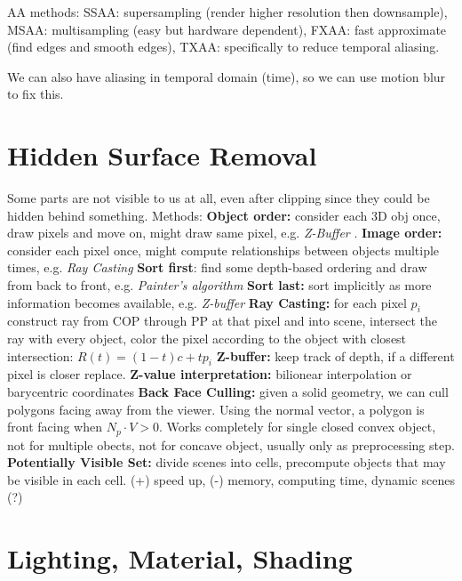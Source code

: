\documentclass[a4paper]{article}
\begin{document}
AA methods:
SSAA: supersampling (render higher resolution then downsample), MSAA: multisampling (easy but hardware dependent), FXAA: fast approximate (find edges and smooth edges), TXAA: specifically to reduce temporal aliasing.

We can also have aliasing in temporal domain (time), so we can use motion blur to fix this.



\section{ Hidden Surface Removal}

Some parts are not visible to us at all, even after clipping since they could be hidden behind something. Methods:
\textbf{Object order:}  consider each 3D obj once, draw pixels and move on, might draw same pixel, e.g. \textit{Z-Buffer} .
\newline
\textbf{Image order:} consider each pixel once, might compute relationships between objects multiple times, e.g. \textit{Ray Casting} 
\newline
\textbf{Sort first}: find some depth-based ordering and draw from back to front, e.g. \textit{Painter's algorithm}
\newline
\textbf{Sort last:} sort implicitly as more information becomes available, e.g. \textit{Z-buffer}    
\textbf{Ray Casting:} for each pixel $p_i$ construct ray from COP through PP at that pixel and into scene, intersect the ray with every object, color the pixel according to the object with closest intersection: $R(t)=(1-t)c + tp_i$ 
\newline
\textbf{Z-buffer:} keep track of depth, if a different pixel is closer replace.  
\textbf{Z-value interpretation: } bilionear interpolation or barycentric coordinates 
\newline
\textbf{Back Face Culling: } given a solid geometry, we can cull polygons facing away from the viewer. Using the normal vector, a polygon is front facing when $N_p \cdot V > 0$. Works completely for single closed convex object, not for multiple obects, not for concave object, usually only as preprocessing step.
\textbf{Potentially Visible Set:} divide scenes into cells, precompute objects that may be visible in each cell. (+) speed up, (-) memory, computing time, dynamic scenes (?) 
\section{Lighting, Material, Shading}
\end{document}
